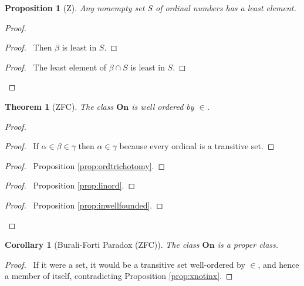 \documentclass{book}
\let\qed\relax
\newtheorem{prop}[ax]{Proposition}
\newtheorem{cor}{Corollary}[ax]
\newtheorem{thm}[ax]{Theorem}
\theoremstyle{definition}
\begin{document}
\begin{prop}[Z]
\label{prop:ordwellord}
Any nonempty set $S$ of ordinal numbers has a least element.
\end{prop}

\begin{proof}
\pf
{}
\begin{proof}
	\pf\ Then $\beta$ is least in $S$.
\end{proof}
\begin{proof}
	\pf\ The least element of $\beta \cap S$ is least in $S$.
\end{proof}
\qed
\end{proof}

\begin{thm}[ZFC]
\label{thm:Onwellord}
The class $\mathbf{On}$ is well ordered by $\in$.
\end{thm}

\begin{proof}
\pf
{}
\begin{proof}
	\pf\ If $\alpha \in \beta \in \gamma$ then $\alpha \in \gamma$ because every ordinal is a transitive set.
\end{proof}
\begin{proof}
	\pf\ Proposition \ref{prop:ordtrichotomy}.
\end{proof}
\begin{proof}
	\pf\ Proposition \ref{prop:linord}.
\end{proof}
\begin{proof}
	\pf\ Proposition \ref{prop:inwellfounded}.
\end{proof}
\qed
\end{proof}

\begin{cor}[Burali-Forti Paradox (ZFC)]
The class $\mathbf{On}$ is a proper class.
\end{cor}

\begin{proof}
\pf\ If it were a set, it would be a transitive set well-ordered by $\in$, and hence a member of itself, contradicting Proposition \ref{prop:xnotinx}.
\end{proof}
\end{document}
